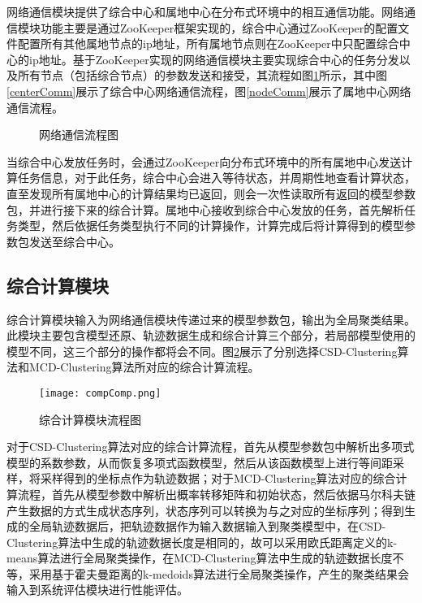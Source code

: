 网络通信模块提供了综合中心和属地中心在分布式环境中的相互通信功能。网络通信模块功能主要是通过ZooKeeper框架实现的，综合中心通过ZooKeeper的配置文件配置所有其他属地节点的ip地址，所有属地节点则在ZooKeeper中只配置综合中心的ip地址。基于ZooKeeper实现的网络通信模块主要实现综合中心的任务分发以及所有节点（包括综合节点）的参数发送和接受，其流程如图\ref{comm}所示，其中图\ref{centerComm}展示了综合中心网络通信流程，图\ref{nodeComm}展示了属地中心网络通信流程。
\begin{figure}[H]
\caption{网络通信流程图}
\label{comm}
\end{figure}

当综合中心发放任务时，会通过ZooKeeper向分布式环境中的所有属地中心发送计算任务信息，对于此任务，综合中心会进入等待状态，并周期性地查看计算状态，直至发现所有属地中心的计算结果均已返回，则会一次性读取所有返回的模型参数包，并进行接下来的综合计算。属地中心接收到综合中心发放的任务，首先解析任务类型，然后依据任务类型执行不同的计算操作，计算完成后将计算得到的模型参数包发送至综合中心。

\subsection{综合计算模块}

综合计算模块输入为网络通信模块传递过来的模型参数包，输出为全局聚类结果。此模块主要包含模型还原、轨迹数据生成和综合计算三个部分，若局部模型使用的模型不同，这三个部分的操作都将会不同。图\ref{compComp}展示了分别选择CSD-Clustering算法和MCD-Clustering算法所对应的综合计算流程。
\begin{figure}[H]
	\texttt{[image: compComp.png]}
	\caption{综合计算模块流程图}
	\label{compComp}
\end{figure}

对于CSD-Clustering算法对应的综合计算流程，首先从模型参数包中解析出多项式模型的系数参数，从而恢复多项式函数模型，然后从该函数模型上进行等间距采样，将采样得到的坐标点作为轨迹数据；对于MCD-Clustering算法对应的综合计算流程，首先从模型参数中解析出概率转移矩阵和初始状态，然后依据马尔科夫链产生数据的方式生成状态序列，状态序列可以转换为与之对应的坐标序列；得到生成的全局轨迹数据后，把轨迹数据作为输入数据输入到聚类模型中，在CSD-Clustering算法中生成的轨迹数据长度是相同的，故可以采用欧氏距离定义的k-means算法进行全局聚类操作，在MCD-Clustering算法中生成的轨迹数据长度不等，采用基于霍夫曼距离的k-medoids算法进行全局聚类操作，产生的聚类结果会输入到系统评估模块进行性能评估。

